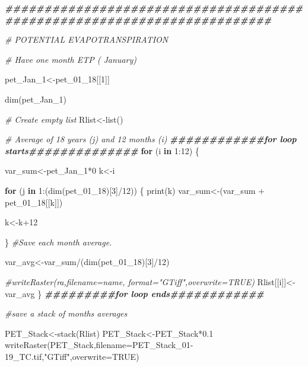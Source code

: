 \documentclass[
  10pt,
  b5paper,
]{book}
\newenvironment{Shaded}{\begin{snugshade}}{\end{snugshade}}
\newcommand{\AttributeTok}[1]{\textcolor[rgb]{0.77,0.63,0.00}{#1}}
\newcommand{\CommentTok}[1]{\textcolor[rgb]{0.56,0.35,0.01}{\textit{#1}}}
\newcommand{\ConstantTok}[1]{\textcolor[rgb]{0.00,0.00,0.00}{#1}}
\newcommand{\ControlFlowTok}[1]{\textcolor[rgb]{0.13,0.29,0.53}{\textbf{#1}}}
\newcommand{\DecValTok}[1]{\textcolor[rgb]{0.00,0.00,0.81}{#1}}
\newcommand{\DocumentationTok}[1]{\textcolor[rgb]{0.56,0.35,0.01}{\textbf{\textit{#1}}}}
\newcommand{\FloatTok}[1]{\textcolor[rgb]{0.00,0.00,0.81}{#1}}
\newcommand{\FunctionTok}[1]{\textcolor[rgb]{0.00,0.00,0.00}{#1}}
\newcommand{\NormalTok}[1]{#1}
\newcommand{\OtherTok}[1]{\textcolor[rgb]{0.56,0.35,0.01}{#1}}
\newcommand{\SpecialCharTok}[1]{\textcolor[rgb]{0.00,0.00,0.00}{#1}}
\newcommand{\StringTok}[1]{\textcolor[rgb]{0.31,0.60,0.02}{#1}}
\begin{document}
\begin{Shaded}
\begin{Highlighting}[]
\DocumentationTok{\#\#\#\#\#\#\#\#\#\#\#\#\#\#\#\#\#\#\#\#\#\#\#\#\#\#\#\#\#\#\#\#\#\#\#\#\#\#\#\#\#\#\#\#\#\#\#\#\#\#\#\#\#\#\#\#\#\#\#\#\#\#\#\#\#\#\#\#\#\#\#\#}

\CommentTok{\# POTENTIAL EVAPOTRANSPIRATION }

\CommentTok{\# Have one month ETP ( January)}

\NormalTok{pet\_Jan\_1}\OtherTok{\textless{}{-}}\NormalTok{pet\_01\_18[[}\DecValTok{1}\NormalTok{]]}

\FunctionTok{dim}\NormalTok{(pet\_Jan\_1)}

\CommentTok{\# Create empty list}
\NormalTok{Rlist}\OtherTok{\textless{}{-}}\FunctionTok{list}\NormalTok{()}

\CommentTok{\# Average of 18 years (j)  and 12 months (i) }
\DocumentationTok{\#\#\#\#\#\#\#\#\#\#\#\#for loop starts\#\#\#\#\#\#\#\#\#\#\#\#\#\#}
\ControlFlowTok{for}\NormalTok{ (i }\ControlFlowTok{in} \DecValTok{1}\SpecialCharTok{:}\DecValTok{12}\NormalTok{) \{ }

\NormalTok{var\_sum}\OtherTok{\textless{}{-}}\NormalTok{pet\_Jan\_1}\SpecialCharTok{*}\DecValTok{0}
\NormalTok{k}\OtherTok{\textless{}{-}}\NormalTok{i}

\ControlFlowTok{for}\NormalTok{ (j }\ControlFlowTok{in} \DecValTok{1}\SpecialCharTok{:}\NormalTok{(}\FunctionTok{dim}\NormalTok{(pet\_01\_18)[}\DecValTok{3}\NormalTok{]}\SpecialCharTok{/}\DecValTok{12}\NormalTok{)) \{}
\FunctionTok{print}\NormalTok{(k)}
\NormalTok{var\_sum}\OtherTok{\textless{}{-}}\NormalTok{(var\_sum }\SpecialCharTok{+}\NormalTok{ pet\_01\_18[[k]])}

\NormalTok{k}\OtherTok{\textless{}{-}}\NormalTok{k}\SpecialCharTok{+}\DecValTok{12}

\NormalTok{\}}
\CommentTok{\#Save each month average. }

\NormalTok{var\_avg}\OtherTok{\textless{}{-}}\NormalTok{var\_sum}\SpecialCharTok{/}\NormalTok{(}\FunctionTok{dim}\NormalTok{(pet\_01\_18)[}\DecValTok{3}\NormalTok{]}\SpecialCharTok{/}\DecValTok{12}\NormalTok{)}

\CommentTok{\#writeRaster(ra,filename=name, format="GTiff",overwrite=TRUE)}
\NormalTok{Rlist[[i]]}\OtherTok{\textless{}{-}}\NormalTok{var\_avg}
\NormalTok{\}}
\DocumentationTok{\#\#\#\#\#\#\#\#\#for loop ends\#\#\#\#\#\#\#\#\#\#\#\#}

\CommentTok{\#save a stack of months averages}

\NormalTok{PET\_Stack}\OtherTok{\textless{}{-}}\FunctionTok{stack}\NormalTok{(Rlist)}
\NormalTok{PET\_Stack}\OtherTok{\textless{}{-}}\NormalTok{PET\_Stack}\SpecialCharTok{*}\FloatTok{0.1}
\FunctionTok{writeRaster}\NormalTok{(PET\_Stack,}\AttributeTok{filename=}\StringTok{\textquotesingle{}PET\_Stack\_01{-}19\_TC.tif\textquotesingle{}}\NormalTok{,}\StringTok{"GTiff"}\NormalTok{,}\AttributeTok{overwrite=}\ConstantTok{TRUE}\NormalTok{)}
\end{Highlighting}
\end{Shaded}
\end{document}
